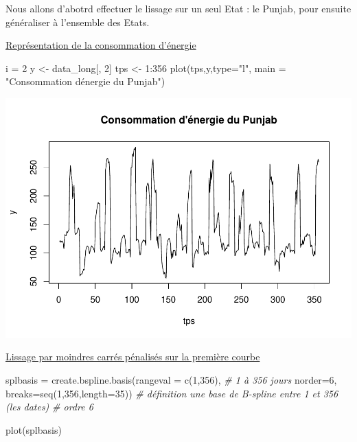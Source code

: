 \documentclass[
]{article}
\newenvironment{Shaded}{\begin{snugshade}}{\end{snugshade}}
\newcommand{\AttributeTok}[1]{\textcolor[rgb]{0.77,0.63,0.00}{#1}}
\newcommand{\CommentTok}[1]{\textcolor[rgb]{0.56,0.35,0.01}{\textit{#1}}}
\newcommand{\DecValTok}[1]{\textcolor[rgb]{0.00,0.00,0.81}{#1}}
\newcommand{\FunctionTok}[1]{\textcolor[rgb]{0.00,0.00,0.00}{#1}}
\newcommand{\NormalTok}[1]{#1}
\newcommand{\OtherTok}[1]{\textcolor[rgb]{0.56,0.35,0.01}{#1}}
\newcommand{\SpecialCharTok}[1]{\textcolor[rgb]{0.00,0.00,0.00}{#1}}
\newcommand{\StringTok}[1]{\textcolor[rgb]{0.31,0.60,0.02}{#1}}
\begin{document}
Nous allons d'abotrd effectuer le lissage sur un seul Etat : le Punjab,
pour ensuite généraliser à l'ensemble des Etats.

\uline{Représentation de la consommation d'énergie}

\begin{Shaded}
\begin{Highlighting}[]
\NormalTok{i }\OtherTok{=} \DecValTok{2}
\NormalTok{y }\OtherTok{\textless{}{-}}\NormalTok{ data\_long[, }\DecValTok{2}\NormalTok{] }
\NormalTok{tps }\OtherTok{\textless{}{-}} \DecValTok{1}\SpecialCharTok{:}\DecValTok{356}
\FunctionTok{plot}\NormalTok{(tps,y,}\AttributeTok{type=}\StringTok{"l"}\NormalTok{, }\AttributeTok{main =} \StringTok{"Consommation d\textquotesingle{}énergie du Punjab"}\NormalTok{)}
\end{Highlighting}
\end{Shaded}

\includegraphics{Projet_CHESNAIS_GUIBERT_files/figure-latex/unnamed-chunk-21-1.pdf}

\uline{Lissage par moindres carrés pénalisés sur la première courbe}

\begin{Shaded}
\begin{Highlighting}[]
\NormalTok{splbasis }\OtherTok{=} \FunctionTok{create.bspline.basis}\NormalTok{(}\AttributeTok{rangeval =} \FunctionTok{c}\NormalTok{(}\DecValTok{1}\NormalTok{,}\DecValTok{356}\NormalTok{), }\CommentTok{\# 1 à 356 jours}
                                \AttributeTok{norder=}\DecValTok{6}\NormalTok{, }
                                \AttributeTok{breaks=}\FunctionTok{seq}\NormalTok{(}\DecValTok{1}\NormalTok{,}\DecValTok{356}\NormalTok{,}\AttributeTok{length=}\DecValTok{35}\NormalTok{))}
\CommentTok{\# définition une base de B{-}spline entre 1 et 356 (les dates) }
\CommentTok{\# ordre 6 }

\FunctionTok{plot}\NormalTok{(splbasis)}
\end{Highlighting}
\end{Shaded}
\end{document}
